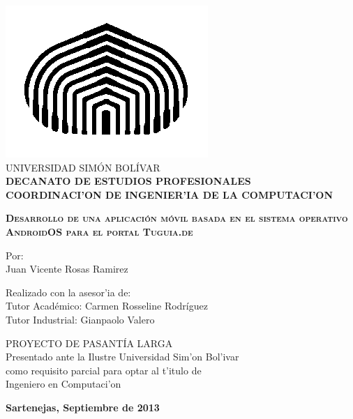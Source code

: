 \begin{titlepage}
\begin{center}

\includegraphics[scale=0.5,type=png,ext=.png,read=.png]{imagenes/cebolla} \\

\textsc {\large UNIVERSIDAD SIMÓN BOLÍVAR} \\
\textsc{\bfseries DECANATO DE ESTUDIOS PROFESIONALES\\
COORDINACI'ON DE INGENIER'IA DE LA COMPUTACI'ON}

\bigskip
\bigskip
\bigskip
\bigskip
\bigskip
\bigskip
\bigskip
\bigskip
\bigskip

\textsc{\bfseries Desarrollo de una aplicación móvil basada en el sistema operativo AndroidOS para el portal Tuguia.de}

\bigskip
\bigskip
\bigskip
\bigskip
\bigskip

\begin{minipage}{\textwidth}
\centering
Por: \\
Juan Vicente Rosas Ramirez 

\bigskip
\bigskip
\bigskip

Realizado con la asesor'ia de: \\
Tutor Académico: Carmen Rosseline Rodríguez \\
Tutor Industrial: Gianpaolo Valero
\end{minipage}

\bigskip
\bigskip
\bigskip
\bigskip
\bigskip
\bigskip
\bigskip
\bigskip
\bigskip

{PROYECTO DE PASANTÍA LARGA \\ Presentado ante la Ilustre Universidad Sim'on Bol'ivar \\
como requisito parcial para optar al t'itulo de \\ Ingeniero en Computaci'on} \\

\bigskip
\bigskip
\vfill

{\large \bfseries Sartenejas, 
Septiembre de 2013}

\end{center}
\end{titlepage}
